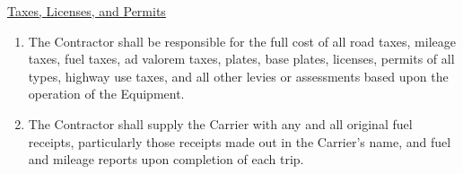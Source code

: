\underline{Taxes, Licenses, and Permits}
\begin{enumerate}[
    ref = \SecondLevelEnumerator
]
    \item The Contractor shall be responsible for the full cost of all road
    taxes, mileage taxes, fuel taxes, ad valorem taxes, plates, base
    plates, licenses, permits of all types, highway use taxes, and all
    other levies or assessments based upon the operation of the Equipment.

    \item The Contractor shall supply the Carrier with any and all original
    fuel receipts, particularly those receipts made out in the Carrier's
    name, and fuel and mileage reports upon completion of each trip.
\end{enumerate}